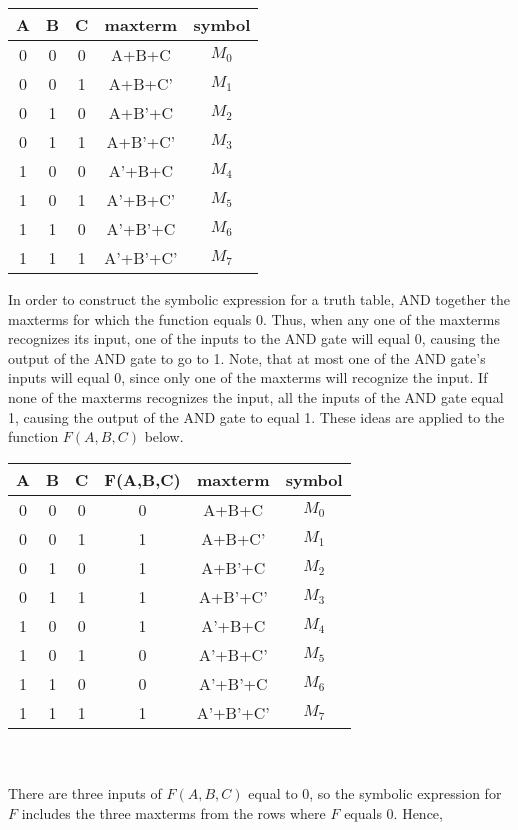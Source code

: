 \begin{tabular}{c|c|c||c|c}
A & B & C & maxterm   & symbol \\ \hline
0 & 0 & 0 & A+B+C     & $M_0$   \\ \hline
0 & 0 & 1 & A+B+C'    & $M_1$   \\ \hline
0 & 1 & 0 & A+B'+C    & $M_2$   \\ \hline
0 & 1 & 1 & A+B'+C'   & $M_3$   \\ \hline
1 & 0 & 0 & A'+B+C    & $M_4$   \\ \hline
1 & 0 & 1 & A'+B+C'   & $M_5$   \\ \hline
1 & 1 & 0 & A'+B'+C   & $M_6$   \\ \hline
1 & 1 & 1 & A'+B'+C'  & $M_7$   \\
\end{tabular}

In order to construct the symbolic expression for a truth table,
AND together the maxterms for which the function equals 0. Thus,
when any one of the maxterms recognizes its input, one of the
inputs to the AND gate will equal 0, causing the output of the
AND gate to go to 1.  Note, that at most one of the AND gate's
inputs will equal 0, since only one of the maxterms will recognize
the input.  If none of the maxterms recognizes the input, all the
inputs of the AND gate equal 1, causing the output of the
AND gate to equal 1.  These ideas are applied to
the function $F(A,B,C)$ below.

\begin{tabular}{c|c|c||c|c|c}
A & B & C & F(A,B,C) & maxterm   & symbol \\ \hline
0 & 0 & 0 & 0        & A+B+C     & $M_0$   \\ \hline
0 & 0 & 1 & 1        & A+B+C'    & $M_1$   \\ \hline
0 & 1 & 0 & 1        & A+B'+C    & $M_2$   \\ \hline
0 & 1 & 1 & 1        & A+B'+C'   & $M_3$   \\ \hline
1 & 0 & 0 & 1        & A'+B+C    & $M_4$   \\ \hline
1 & 0 & 1 & 0        & A'+B+C'   & $M_5$   \\ \hline
1 & 1 & 0 & 0        & A'+B'+C   & $M_6$   \\ \hline
1 & 1 & 1 & 1        & A'+B'+C'  & $M_7$   \\
\end{tabular}
\\ \\
There are three inputs of $F(A,B,C)$ equal to 0, so the symbolic
expression for $F$ includes the three maxterms from the rows where
$F$ equals 0.  Hence,

